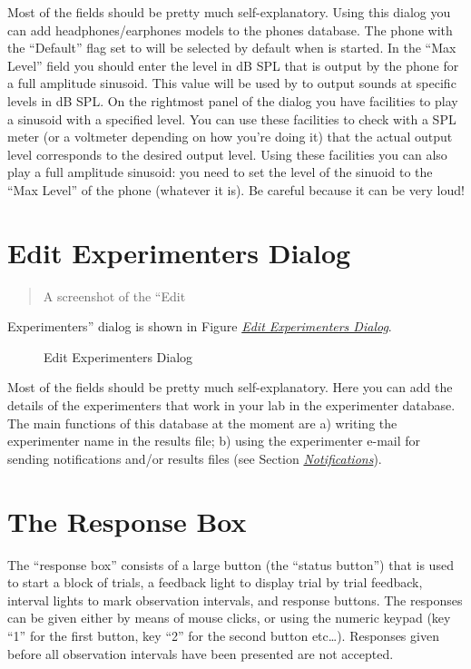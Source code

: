 \documentclass[a4paper,12pt,english]{sphinxmanual}
\begin{document}
Most of the fields should be pretty much self-explanatory. Using this
dialog you can add headphones/earphones models to the phones database.
The phone with the “Default” flag set to will be selected by default
when  is started. In the “Max Level” field you should
enter the level in dB SPL that is output by the phone for a full
amplitude sinusoid. This value will be used by  to
output sounds at specific levels in dB SPL. On the rightmost panel of
the dialog you have facilities to play a sinusoid with a specified
level. You can use these facilities to check with a SPL meter (or a
voltmeter depending on how you’re doing it) that the actual output level
corresponds to the desired output level. Using these facilities you can
also play a full amplitude sinusoid: you need to set the level of the
sinuoid to the “Max Level” of the phone (whatever it is). Be careful
because it can be very loud!


\section{Edit Experimenters Dialog}
\label{graphical_user_interface:edit-experimenters-dialog}\label{graphical_user_interface:sec-edit-experimenters-dia}\begin{quote}

A screenshot of the “Edit
\end{quote}

Experimenters” dialog is shown in
Figure {\hyperref[graphical_user_interface:fig-experimenter-database]{\emph{Edit Experimenters Dialog}}}.
\begin{figure}[htbp]
\centering
\capstart

\caption{Edit Experimenters Dialog}\label{graphical_user_interface:fig-experimenter-database}\end{figure}

Most of the fields should be pretty much self-explanatory. Here you can
add the details of the experimenters that work in your lab in the
experimenter database. The main functions of this database at the moment
are a) writing the experimenter name in the results file; b) using the
experimenter e-mail for sending notifications and/or results files (see
Section {\hyperref[graphical_user_interface:sec-edit-pref-dia-notifications]{\emph{Notifications}}}).


\section{The Response Box}
\label{graphical_user_interface:the-response-box}
The “response box” consists of a large button (the “status button”) that
is used to start a block of trials, a feedback light to display trial by
trial feedback, interval lights to mark observation intervals, and
response buttons. The responses can be given either by means of mouse
clicks, or using the numeric keypad (key “1” for the first button, key
“2” for the second button etc…). Responses given before all observation
intervals have been presented are not accepted.
\end{document}
